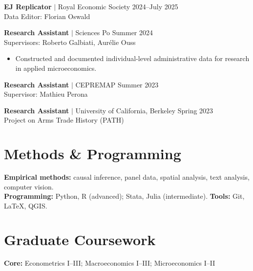 \documentclass[a4paper,11pt]{article}
\begin{document}
\normalsize{\textbf{EJ Replicator} $|$ Royal Economic Society \hfill 2024--July 2025 \\
Data Editor: Florian Oswald}

\normalsize{\textbf{Research Assistant} $|$ Sciences Po \hfill Summer 2024 \\
Supervisors: Roberto Galbiati, Aurélie Ouss}
\small{\begin{itemize}[itemsep=-0.1em, before=\vspace{-1em}, after=\vspace{-0.25em}]
    \item Constructed and documented individual-level administrative data for research in applied microeconomics. \\[-1.5em]
\end{itemize}}

\normalsize{\textbf{Research Assistant} $|$ CEPREMAP \hfill Summer 2023 \\
Supervisor: Mathieu Perona}

\normalsize{\textbf{Research Assistant} $|$ University of California, Berkeley \hfill Spring 2023 \\
Project on Arms Trade History (PATH)}


\section{Methods \& Programming}

\normalsize
\textbf{Empirical methods:} causal inference, panel data, spatial analysis, text analysis, computer vision. \\[-1.5em]

\textbf{Programming:} Python, R (advanced); Stata, Julia (intermediate). \quad
\textbf{Tools:} Git, \LaTeX, QGIS.


\section{Graduate Coursework}

\normalsize
\textbf{Core:} Econometrics I--III; Macroeconomics I--III; Microeconomics I--II \\[-1.5em]
\end{document}
